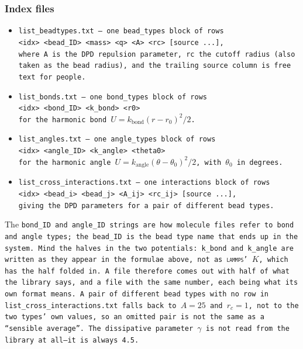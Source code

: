 \subsubsection*{Index files}

\begin{itemize}[noitemsep]
  \item \tt{list_beadtypes.txt} --- one \tt{bead_types} block of rows\\
    \tt{<idx> <bead_ID> <mass> <q> <A> <rc> [source ...]},\\
    where \tt{A} is the DPD repulsion parameter, \tt{rc} the cutoff radius
    (also taken as the bead radius), and the trailing source column is free
    text for people.

  \item \tt{list_bonds.txt} --- one \tt{bond_types} block of rows\\
    \tt{<idx> <bond_ID> <k_bond> <r0>}\\
    for the harmonic bond $U = k_\text{bond} (r - r_0)^2 / 2$.

  \item \tt{list_angles.txt} --- one \tt{angle_types} block of rows\\
    \tt{<idx> <angle_ID> <k_angle> <theta0>}\\
    for the harmonic angle $U = k_\text{angle} (\theta - \theta_0)^2 / 2$, with
    $\theta_0$ in degrees.

  \item \tt{list_cross_interactions.txt} --- one \tt{interactions} block of
    rows\\
    \tt{<idx> <bead_i> <bead_j> <A_ij> <rc_ij> [source ...]},\\
    giving the DPD parameters for a pair of different bead types.
\end{itemize}

The \tt{bond_ID} and \tt{angle_ID} strings are how molecule files refer to bond
and angle types; the \tt{bead_ID} is the bead type name that ends up in the
system. Mind the halves in the two potentials: \tt{k_bond} and \tt{k_angle} are
written as they appear in the formulae above, not as \textsc{lammps}' $K$, which
has the half folded in. A \data file therefore comes out with half of what the
library says, and a \field file with the same number, each being what its own
format means. A pair of different bead types with no row in
\tt{list_cross_interactions.txt} falls back to $A = 25$ and $r_c = 1$, not to
the two types' own values, so an omitted pair is not the same as a
\enquote{sensible average}. The dissipative parameter $\gamma$ is not read from
the library at all---it is always 4.5.


